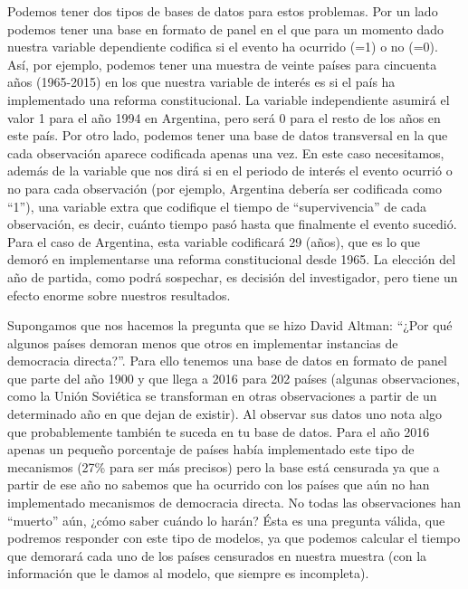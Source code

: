 \documentclass[]{book}
\begin{document}
Podemos tener dos tipos de bases de datos para estos problemas. Por un
lado podemos tener una base en formato de panel en el que para un
momento dado nuestra variable dependiente codifica si el evento ha
ocurrido (=1) o no (=0). Así, por ejemplo, podemos tener una muestra de
veinte países para cincuenta años (1965-2015) en los que nuestra
variable de interés es si el país ha implementado una reforma
constitucional. La variable independiente asumirá el valor 1 para el año
1994 en Argentina, pero será 0 para el resto de los años en este país.
Por otro lado, podemos tener una base de datos transversal en la que
cada observación aparece codificada apenas una vez. En este caso
necesitamos, además de la variable que nos dirá si en el periodo de
interés el evento ocurrió o no para cada observación (por ejemplo,
Argentina debería ser codificada como ``1''), una variable extra que
codifique el tiempo de ``supervivencia'' de cada observación, es decir,
cuánto tiempo pasó hasta que finalmente el evento sucedió. Para el caso
de Argentina, esta variable codificará 29 (años), que es lo que demoró
en implementarse una reforma constitucional desde 1965. La elección del
año de partida, como podrá sospechar, es decisión del investigador, pero
tiene un efecto enorme sobre nuestros resultados.

Supongamos que nos hacemos la pregunta que se hizo David Altman: ``¿Por
qué algunos países demoran menos que otros en implementar instancias de
democracia directa?''. Para ello tenemos una base de datos en formato de
panel que parte del año 1900 y que llega a 2016 para 202 países (algunas
observaciones, como la Unión Soviética se transforman en otras
observaciones a partir de un determinado año en que dejan de existir).
Al observar sus datos uno nota algo que probablemente también te suceda
en tu base de datos. Para el año 2016 apenas un pequeño porcentaje de
países había implementado este tipo de mecanismos (27\% para ser más
precisos) pero la base está censurada ya que a partir de ese año no
sabemos que ha ocurrido con los países que aún no han implementado
mecanismos de democracia directa. No todas las observaciones han
``muerto'' aún, ¿cómo saber cuándo lo harán? Ésta es una pregunta
válida, que podremos responder con este tipo de modelos, ya que podemos
calcular el tiempo que demorará cada uno de los países censurados en
nuestra muestra (con la información que le damos al modelo, que siempre
es incompleta).
\end{document}
